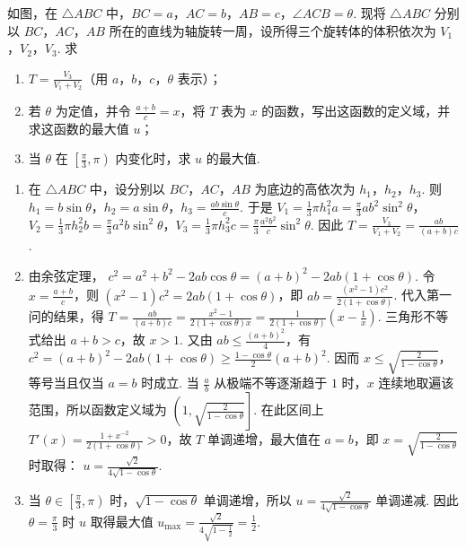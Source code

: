 \documentclass[UTF8,a4paper,oneside,11pt]{ctexbook}
\begin{document}
\begin{problem}
如图，在 \(\triangle ABC\) 中，\(BC = a\)，\(AC = b\)，\(AB = c\)，\(\angle ACB = \theta\). 现将 \(\triangle ABC\) 分别以 \(BC\)，\(AC\)，\(AB\) 所在的直线为轴旋转一周，设所得三个旋转体的体积依次为 \(V_1\)，\(V_2\)，\(V_3\). 求

\begin{enumerate}
\item \(T = \frac{V_3}{V_1 + V_2}\)（用 \(a\)，\(b\)，\(c\)，\(\theta\) 表示）；
\item 若 \(\theta\) 为定值，并令 \(\frac{a + b}{c} = x\)，将 \(T\) 表为 \(x\) 的函数，写出这函数的定义域，并求这函数的最大值 \(u\)；
\item 当 \(\theta\) 在 \(\left[\frac{\pi}{3},\pi\right)\) 内变化时，求 \(u\) 的最大值.
\end{enumerate}

\end{problem}

\begin{solution}
\begin{enumerate}
\item 在 \(\triangle ABC\) 中，设分别以 \(BC\)，\(AC\)，\(AB\) 为底边的高依次为 \(h_1\)，\(h_2\)，\(h_3\). 则 \(h_1 = b\sin \theta\)，\(h_2 = a\sin \theta\)，\(h_3 = \frac{ab\sin \theta}{c}\). 于是 \(V_1 = \frac{1}{3}\pi h_1^2 a = \frac{\pi}{3}ab^2\sin^2 \theta\)，\(V_2 = \frac{1}{3}\pi h_2^2 b = \frac{\pi}{3}a^2b\sin^2 \theta\)，\(V_3 = \frac{1}{3}\pi h_3^2 c = \frac{\pi}{3}\frac{a^2b^2}{c}\sin^2 \theta\). 因此 \(T = \frac{V_3}{V_1 + V_2} = \frac{ab}{(a + b)c}\).
\item 由余弦定理，
\(c^2=a^2+b^2-2ab\cos\theta=(a+b)^2-2ab(1+\cos\theta)\). 令 \(x=\frac{a+b}{c}\)，则
\((x^2-1)c^2=2ab(1+\cos\theta)\)，即 \(ab=\frac{(x^2-1)c^2}{2(1+\cos\theta)}\). 代入第一问的结果，得
\(T=\frac{ab}{(a+b)c}=\frac{x^2-1}{2(1+\cos\theta)x}=\frac{1}{2(1+\cos\theta)}\left(x-\frac1x\right)\).
三角形不等式给出 \(a+b>c\)，故 \(x>1\). 又由 \(ab\leqslant\frac{(a+b)^2}{4}\)，有
\(c^2=(a+b)^2-2ab(1+\cos\theta)\geqslant\frac{1-\cos\theta}{2}(a+b)^2\). 因而 \(x\leqslant\sqrt{\frac{2}{1-\cos\theta}}\)，等号当且仅当 \(a=b\) 时成立. 当 \(\frac{a}{b}\) 从极端不等逐渐趋于 \(1\) 时，\(x\) 连续地取遍该范围，所以函数定义域为
\(\left(1,\sqrt{\frac{2}{1-\cos\theta}}\right]\). 在此区间上
\(T'(x)=\frac{1+x^{-2}}{2(1+\cos\theta)}>0\)，故 \(T\) 单调递增，最大值在 \(a=b\)，即 \(x=\sqrt{\frac{2}{1-\cos\theta}}\) 时取得：
\(u=\frac{\sqrt2}{4\sqrt{1-\cos\theta}}\).
\item 当 \(\theta\in\left[\frac{\pi}{3},\pi\right)\) 时，\(\sqrt{1-\cos\theta}\) 单调递增，所以 \(u=\frac{\sqrt2}{4\sqrt{1-\cos\theta}}\) 单调递减. 因此 \(\theta=\frac{\pi}{3}\) 时 \(u\) 取得最大值
\(u_{\max}=\frac{\sqrt2}{4\sqrt{1-\frac12}}=\frac12\).
\end{enumerate}
\end{solution}

\end{document}
